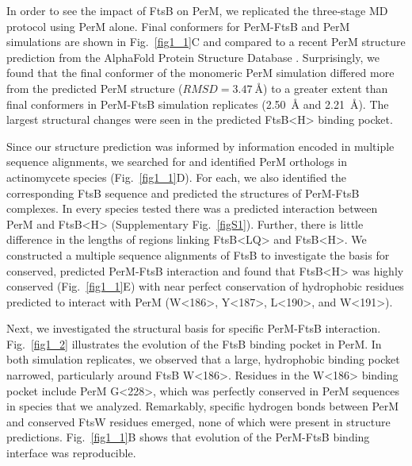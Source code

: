 \documentclass[twocolumn,pdflatex,sn-nature]{sn-jnl}%
\def\textsuperscript#1{<#1>}%
\newcommand\ftsbLQ{FtsB\textsuperscript{LQ}}
\newcommand\ftsbH{FtsB\textsuperscript{H}}
\begin{document}
In order to see the impact of FtsB on PerM, we replicated the three-stage MD protocol using PerM alone.
Final conformers for PerM-FtsB and PerM simulations are shown in Fig.~\ref{fig1_1}C and compared to a recent PerM structure prediction from the AlphaFold Protein Structure Database \citep{varadiAlphaFoldProteinStructure2022}.
Surprisingly, we found that the final conformer of the monomeric PerM simulation differed more from the predicted PerM structure ($RMSD=\qty{3.47}{\angstrom}$) to a greater extent than final conformers in PerM-FtsB simulation replicates (\qty{2.50}{\angstrom} and \qty{2.21}{\angstrom}).
The largest structural changes were seen in the predicted \ftsbH{} binding pocket.

Since our structure prediction was informed by information encoded in multiple sequence alignments, we searched for and identified PerM orthologs in actinomycete species (Fig.~\ref{fig1_1}D).
For each, we also identified the corresponding FtsB sequence and predicted the structures of PerM-FtsB complexes.
In every species tested there was a predicted interaction between PerM and \ftsbH{} (Supplementary Fig.~\ref{figS1}). Further, there is little difference in the lengths of regions linking \ftsbLQ{} and \ftsbH{}.
We constructed a multiple sequence alignments of FtsB to investigate the basis for conserved, predicted PerM-FtsB interaction and found that \ftsbH{} was highly conserved (Fig.~\ref{fig1_1}E) with near perfect conservation of hydrophobic residues predicted to interact with PerM (W\textsuperscript{186}, Y\textsuperscript{187}, L\textsuperscript{190}, and W\textsuperscript{191}).

Next, we investigated the structural basis for specific PerM-FtsB interaction. Fig.~\ref{fig1_2} illustrates the evolution of the FtsB binding pocket in PerM.
In both simulation replicates, we observed that a large, hydrophobic binding pocket narrowed, particularly around FtsB W\textsuperscript{186}. 
Residues in the W\textsuperscript{186} binding pocket include PerM G\textsuperscript{228}, which was perfectly conserved in PerM sequences in species that we analyzed.
Remarkably, specific hydrogen bonds between PerM and conserved FtsW residues emerged, none of which were present in structure predictions.
Fig.~\ref{fig1_1}B shows that evolution of the PerM-FtsB binding interface was reproducible.
\end{document}

